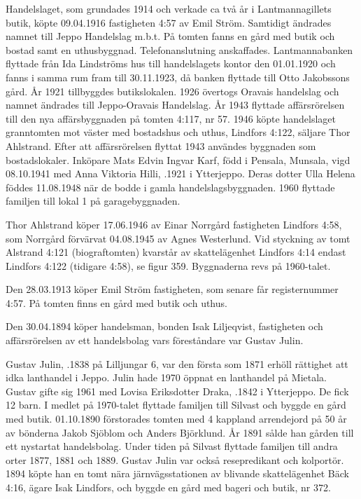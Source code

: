 


Handelslaget, som grundades 1914 och verkade ca två år i Lantmannagillets butik, köpte 09.04.1916 fastigheten 4:57 av Emil Ström.	Samtidigt ändrades namnet till Jeppo Handelslag m.b.t. På tomten fanns en gård med butik och bostad samt en uthusbyggnad. Telefonanslutning anskaffades. Lantmannabanken flyttade från Ida Lindströms	hus till handelslagets kontor den 01.01.1920 och fanns i samma rum fram	till 30.11.1923, då banken flyttade till Otto Jakobssons gård. År 1921 	tillbyggdes butikslokalen. 1926 övertogs Oravais handelslag och	namnet ändrades till Jeppo-Oravais Handelslag. År 1943 flyttade 	affärsrörelsen till den nya affärsbyggnaden på tomten 4:117, nr 57.	1946 köpte handelslaget granntomten mot väster med bostadshus och uthus, Lindfors 4:122, säljare Thor Ahlstrand.
Efter att affärsrörelsen flyttat 1943 användes byggnaden som bostadslokaler. Inköpare Mats Edvin Ingvar Karf, född i Pensala, Munsala, vigd 08.10.1941 med Anna Viktoria Hilli, .1921 i Ytterjeppo. Deras dotter Ulla Helena föddes 11.08.1948 när de bodde i 	gamla handelslagsbyggnaden. 1960 flyttade familjen till lokal 1 på 	garagebyggnaden.


Thor Ahlstrand köper 17.06.1946 av Einar Norrgård fastigheten	Lindfors 4:58, som Norrgård förvärvat 04.08.1945 av Agnes 	Westerlund.	Vid styckning av tomt Alstrand 4:121 (biograftomten) 	kvarstår av skattelägenhet Lindfors 4:14 endast Lindfors 4:122 (tidigare 4:58), se figur 359. Byggnaderna revs på 1960-talet.


Den 28.03.1913 köper Emil Ström fastigheten, som senare får	registernummer 4:57. På tomten finns en gård med butik och uthus.\jhvspace{}


Den 30.04.1894 köper handelsman, bonden Isak Liljeqvist, fastigheten och affärsrörelsen av ett handelsbolag vars föreståndare var Gustav Julin.\jhvspace{}


Gustav Julin, .1838 på Lilljungar 6, var den första som	1871 erhöll rättighet att idka lanthandel i Jeppo. Julin hade 1970 öppnat	en lanthandel på Mietala. Gustav gifte sig 1961 med Lovisa Eriksdotter Draka, .1842 i Ytterjeppo. De fick 12 barn. I medlet på 1970-talet flyttade familjen till Silvast och byggde en gård med butik. 01.10.1890 förstorades tomten med 4 kappland arrendejord på 50 år av bönderna Jakob Sjöblom och Anders Björklund. År 1891 sålde han gården till ett nystartat handelsbolag. Under tiden på Silvast flyttade familjen till andra orter 1877, 1881 och 1889. Gustav Julin var också resepredikant och kolportör. 1894 köpte han en tomt nära järnvägsstationen av blivande skattelägenhet Bäck 4:16, ägare Isak Lindfors, och byggde en gård med bageri och butik, nr 372.



